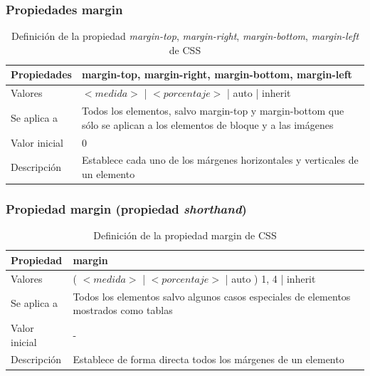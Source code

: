 \begin{frame}
\frametitle{Propiedades margin}

\begin{center}
  \begin{table}
   \begin{tabular}{p{1.8cm}p{7.8cm}}
Propiedades &\bf{margin-top}, \bf{margin-right}, \bf{margin-bottom}, \bf{margin-left} \\ \hline
Valores & $<medida>$ | $<porcentaje>$ | auto | inherit \\ \hline
Se aplica a & Todos los elementos, salvo margin-top y margin-bottom que sólo se aplican a los elementos de bloque y a las imágenes \\ \hline
Valor inicial & 0 \\ \hline
Descripción & Establece cada uno de los márgenes horizontales y verticales de un elemento \\  \hline
  \end{tabular}
    \caption{Definición de la propiedad \emph{margin-top}, \emph{margin-right}, \emph{margin-bottom}, \emph{margin-left} de CSS}
 \end{table}
\end{center}

\end{frame}


\begin{frame}
\frametitle{Propiedad margin (propiedad \emph{shorthand})}

\begin{center}
  \begin{table}
   \begin{tabular}{p{1.8cm}p{7.8cm}}
Propiedad &\bf{margin} \\ \hline
Valores & ( $<medida>$ | $<porcentaje>$ | auto ) {1, 4} | inherit \\ \hline
Se aplica a & Todos los elementos salvo algunos casos especiales de elementos mostrados como tablas \\ \hline
Valor inicial & - \\ \hline
Descripción & Establece de forma directa todos los márgenes de un elemento \\ \hline
 \end{tabular}
   \caption{Definición de la propiedad margin de CSS}
 \end{table}
\end{center}

\end{frame}

